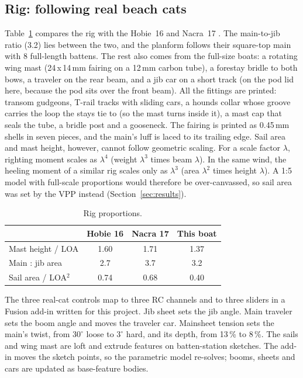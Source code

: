 \documentclass[10pt,twocolumn]{article}
\begin{document}
\subsection{Rig: following real beach cats}
Table~\ref{tab:rig} compares the rig with the Hobie~16 and Nacra~17 \cite{hobie,nacra}. The main-to-jib ratio (3.2) lies between the two, and the planform follows their square-top main with 8 full-length battens. The rest also comes from the full-size boats: a rotating wing mast (24\,x\,14\,mm fairing on a 12\,mm carbon tube), a forestay bridle to both bows, a traveler on the rear beam, and a jib car on a short track (on the pod lid here, because the pod sits over the front beam). All the fittings are printed: transom gudgeons, T-rail tracks with sliding cars, a hounds collar whose groove carries the loop the stays tie to (so the mast turns inside it), a mast cap that seals the tube, a bridle post and a gooseneck. The fairing is printed as 0.45\,mm shells in seven pieces, and the main's luff is laced to its trailing edge. Sail area and mast height, however, cannot follow geometric scaling. For a scale factor $\lambda$, righting moment scales as $\lambda^4$ (weight $\lambda^3$ times beam $\lambda$). In the same wind, the heeling moment of a similar rig scales only as $\lambda^3$ (area $\lambda^2$ times height $\lambda$). A 1:5 model with full-scale proportions would therefore be over-canvassed, so sail area was set by the VPP instead (Section~\ref{sec:results}).

\begin{table}[t]
\centering\small
\caption{Rig proportions.}
\label{tab:rig}
\begin{tabular}{lccc}
\toprule
& Hobie 16 & Nacra 17 & This boat \\
\midrule
Mast height / LOA & 1.60 & 1.71 & 1.37 \\
Main : jib area & 2.7 & 3.7 & 3.2 \\
Sail area / LOA$^2$ & 0.74 & 0.68 & 0.40 \\
\bottomrule
\end{tabular}
\end{table}

The three real-cat controls map to three RC channels and to three sliders in a Fusion add-in written for this project. Jib sheet sets the jib angle. Main traveler sets the boom angle and moves the traveler car. Mainsheet tension sets the main's twist, from $30^\circ$ loose to $3^\circ$ hard, and its depth, from 13\,\% to 8\,\%. The sails and wing mast are loft and extrude features on batten-station sketches. The add-in moves the sketch points, so the parametric model re-solves; booms, sheets and cars are updated as base-feature bodies.
\end{document}
